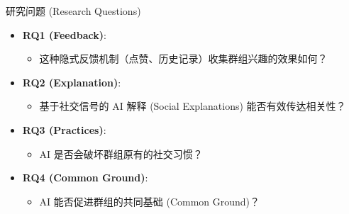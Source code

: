 \documentclass[aspectratio=169]{beamer}
\begin{document}
\begin{frame}{研究问题 (Research Questions)}
    \begin{itemize}
        \item \textbf{RQ1 (Feedback)}: 
        \begin{itemize}
            \item 这种隐式反馈机制（点赞、历史记录）收集群组兴趣的效果如何？
        \end{itemize}
        \vspace{0.3cm}
        \item \textbf{RQ2 (Explanation)}: 
        \begin{itemize}
            \item 基于社交信号的 AI 解释 (Social Explanations) 能否有效传达相关性？
        \end{itemize}
        \vspace{0.3cm}
        \item \textbf{RQ3 (Practices)}: 
        \begin{itemize}
            \item AI 是否会破坏群组原有的社交习惯？
        \end{itemize}
        \vspace{0.3cm}
        \item \textbf{RQ4 (Common Ground)}: 
        \begin{itemize}
            \item AI 能否促进群组的共同基础 (Common Ground)？
        \end{itemize}
    \end{itemize}
\end{frame}
\end{document}

